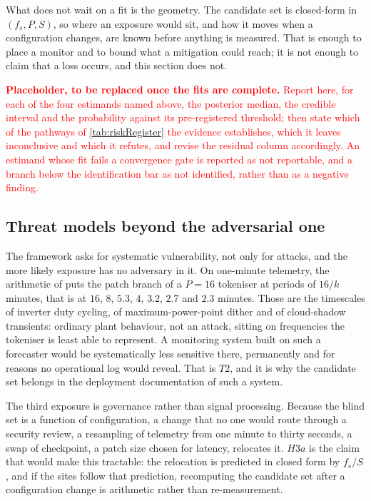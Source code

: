 What does not wait on a fit is the geometry. The candidate set is closed-form in $(f_s,P,S)$, so where an exposure would sit, and how it moves when a configuration changes, are known before anything is measured. That is enough to place a monitor and to bound what a mitigation could reach; it is not enough to claim that a loss occurs, and this section does not.

\textcolor{red}{\textbf{Placeholder, to be replaced once the fits are complete.} Report here, for each of the four estimands named above, the posterior median, the credible interval and the probability against its pre-registered threshold; then state which of the pathways of \autoref{tab:riskRegister} the evidence establishes, which it leaves inconclusive and which it refutes, and revise the residual column accordingly. An estimand whose fit fails a convergence gate is reported as not reportable, and a branch below the identification bar as not identified, rather than as a negative finding.}

\subsection{Threat models beyond the adversarial one}

The framework asks for systematic vulnerability, not only for attacks, and the more likely exposure has no adversary in it. On one-minute telemetry, the arithmetic of  puts the patch branch of a $P{=}16$ tokeniser at periods of $16/k$ minutes, that is at $16$, $8$, $5.3$, $4$, $3.2$, $2.7$ and $2.3$ minutes. Those are the timescales of inverter duty cycling, of maximum-power-point dither and of cloud-shadow transients: ordinary plant behaviour, not an attack, sitting on frequencies the tokeniser is least able to represent. A monitoring system built on such a forecaster would be systematically less sensitive there, permanently and for reasons no operational log would reveal. That is $T2$, and it is why the candidate set belongs in the deployment documentation of such a system.

The third exposure is governance rather than signal processing. Because the blind set is a function of configuration, a change that no one would route through a security review, a resampling of telemetry from one minute to thirty seconds, a swap of checkpoint, a patch size chosen for latency, relocates it. $H3a$ is the claim that would make this tractable: the relocation is predicted in closed form by $f_s/S$, and if the sites follow that prediction, recomputing the candidate set after a configuration change is arithmetic rather than re-measurement.

